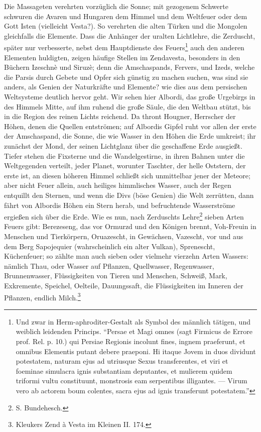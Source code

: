 \documentclass[a4paper, 11pt, oneside, polutonikogreek, german]{article}
\begin{document}
Die Massageten verehrten vorzüglich die Sonne; mit gezogenem Schwerte schwuren die Avaren und Hungaren dem Himmel und dem Weltfeuer oder dem Gott Isten (vielleicht Vesta?). So verehrten die alten Türken und die Mongolen gleichfalls die Elemente. Dass die Anhänger der uralten Lichtlehre, die Zerduscht, später nur verbesserte, nebst dem Hauptdienste des Feuers\footnote{Und zwar in Herm-aphroditer-Gestalt als Symbol des männlich tätigen, und weiblich leidenden Princips. "`Persae et Magi omnes (sagt Firmicus de Errore prof. Rel. p. 10.) qui Persiae Regionis incolunt fines, ingnem praeferunt, et omnibus Elementis putant debere praeponi. Hi itaque Jovem in duos dividunt potestatem, naturam ejus ad utriusque Sexus transferentes, et viri et foeminae simulacra ignis substantiam deputantes, et mulierem quidem triformi vultu constituunt, monstrosis eam serpentibus illigantes. --- Virum vero ab actorem boum colentes, sacra ejus ad ignis transferunt potestatem."'} auch den anderen Elementen huldigten, zeigen häufige Stellen im Zendavesta, besonders in den Büchern Izeschnè und Siruzè; denn die Amschaspands, Fervers, und Izeds, welche die Parsis durch Gebete und Opfer sich günstig zu machen suchen, was sind sie anders, als Genien der Naturkräfte und Elemente? wie dies aus dem persischen Weltsysteme deutlich hervor geht. Wir sehen hier Albordi, das große Urgebirgs in des Himmels Mitte, auf ihm ruhend die große Säule, die den Weltbau stützt, bis in die Region des reinen Lichts reichend. Da thront Hougner, Herrscher der Höhen, denen die Quellen entströmen; auf Albordis Gipfel ruht vor allen der erste der Amschaspand, die Sonne, die wie Wasser in den Höhen die Erde umkreist; ihr zunächst der Mond, der seinen Lichtglanz über die geschaffene Erde ausgießt. Tiefer stehen die Fixsterne und die Wandelgestirne, in ihren Bahnen unter die Weltgegenden verteilt, jeder Planet, worunter Taschter, der helle Oststern, der erste ist, an diesen höheren Himmel schließt sich unmittelbar jener der Meteore; aber nicht Feuer allein, auch heiliges himmlisches Wasser, auch der Regen entquillt den Sternen, und wenn die Divs (böse Genien) die Welt zerrütten, dann fährt von Albordis Höhen ein Stern herab, und befruchtende Wasserströme ergießen sich über die Erde. Wie es nun, nach Zerduschts Lehre\footnote{S. Bundehesch.} sieben Arten Feuers gibt: Berezeseng, das vor Ormurzd und den Königen brennt, Voh-Freuin in Menschen und Tierkörpern, Oruazescht, in Gewächsen, Vazescht, vor und aus dem Berg Sapojequier (wahrscheinlich ein alter Vulkan), Sprenescht, Küchenfeuer; so zählte man auch sieben oder vielmehr vierzehn Arten Wassers: nämlich Thau, oder Wasser auf Pflanzen, Quellwasser, Regenwasser, Brunnenwasser, Flüssigkeiten von Tieren und Menschen, Schweiß, Mark, Exkremente, Speichel, Oelteile, Dauungssaft, die Flüssigkeiten im Inneren der Pflanzen, endlich Milch.\footnote{Kleukers Zend à Vesta im Kleinen II. 174.}
\end{document}
